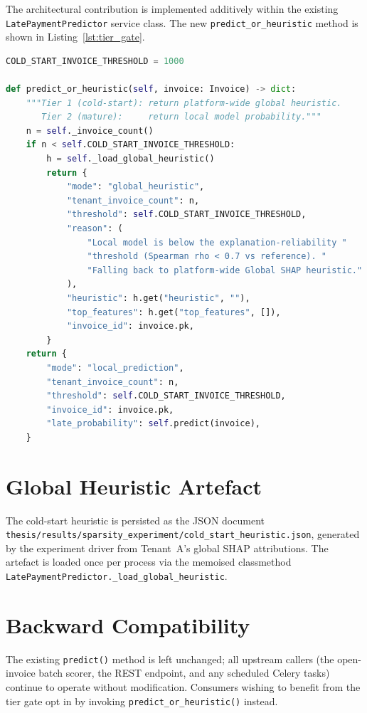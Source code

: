 The architectural contribution is implemented additively within the existing \texttt{LatePaymentPredictor} service class. The new \texttt{predict\_or\_heuristic} method is shown in Listing~\ref{lst:tier_gate}.

\begin{lstlisting}[language=Python, caption={Maturity-Aware AI Routing tier gate.}, label={lst:tier_gate}]
COLD_START_INVOICE_THRESHOLD = 1000

def predict_or_heuristic(self, invoice: Invoice) -> dict:
    """Tier 1 (cold-start): return platform-wide global heuristic.
       Tier 2 (mature):     return local model probability."""
    n = self._invoice_count()
    if n < self.COLD_START_INVOICE_THRESHOLD:
        h = self._load_global_heuristic()
        return {
            "mode": "global_heuristic",
            "tenant_invoice_count": n,
            "threshold": self.COLD_START_INVOICE_THRESHOLD,
            "reason": (
                "Local model is below the explanation-reliability "
                "threshold (Spearman rho < 0.7 vs reference). "
                "Falling back to platform-wide Global SHAP heuristic."
            ),
            "heuristic": h.get("heuristic", ""),
            "top_features": h.get("top_features", []),
            "invoice_id": invoice.pk,
        }
    return {
        "mode": "local_prediction",
        "tenant_invoice_count": n,
        "threshold": self.COLD_START_INVOICE_THRESHOLD,
        "invoice_id": invoice.pk,
        "late_probability": self.predict(invoice),
    }
\end{lstlisting}

\section{Global Heuristic Artefact}
\label{sec:impl_heuristic}

The cold-start heuristic is persisted as the JSON document \texttt{thesis/results/sparsity\_experiment/cold\_start\_heuristic.json}, generated by the experiment driver from Tenant~A's global SHAP attributions. The artefact is loaded once per process via the memoised classmethod \texttt{LatePaymentPredictor.\_load\_global\_heuristic}.

\section{Backward Compatibility}
\label{sec:impl_compat}

The existing \texttt{predict()} method is left unchanged; all upstream callers (the open-invoice batch scorer, the REST endpoint, and any scheduled Celery tasks) continue to operate without modification. Consumers wishing to benefit from the tier gate opt in by invoking \texttt{predict\_or\_heuristic()} instead.
